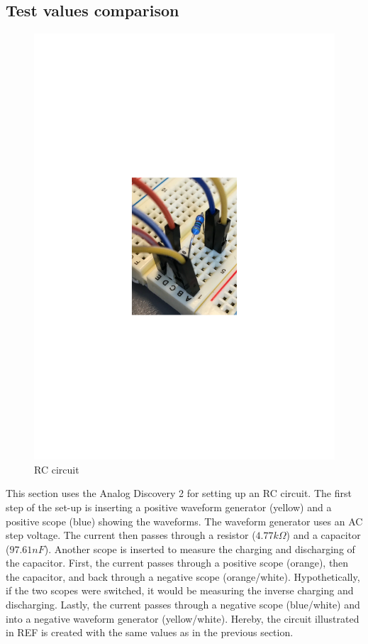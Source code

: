 \subsection{Test values comparison}
\begin{figure}[H]
	\center
		\includegraphics[clip, trim=7cm 11cm 7cm 11cm, scale=1]{fig/img/an_dis_RC}
	\caption{RC circuit}
\end{figure}
This section uses the Analog Discovery 2 for setting up an RC circuit. The first step of the set-up is inserting a positive waveform generator (yellow) and a positive scope (blue) showing the waveforms. The waveform generator uses an AC step voltage. The current then passes through a resistor ($4.77 k\Omega$) and a capacitor ($97.61 nF$). Another scope is inserted to measure the charging and discharging of the capacitor. First, the current passes through a positive scope (orange), then the capacitor, and back through a negative scope (orange/white). Hypothetically, if the two scopes were switched, it would be measuring the inverse charging and discharging. Lastly, the current passes through a negative scope (blue/white) and into a negative waveform generator (yellow/white). Hereby, the circuit illustrated in REF is created with the same values as in the previous section. \\ \\
